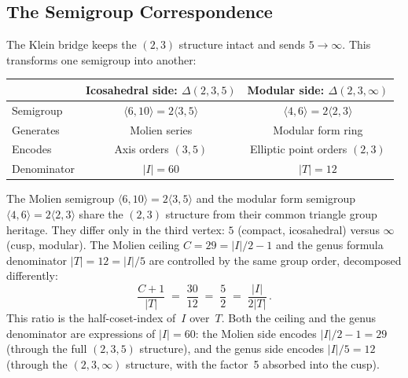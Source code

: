 \documentclass[11pt,letterpaper]{article}
\theoremstyle{definition}
\newcommand{\abs}[1]{\lvert #1 \rvert}
\newcommand{\gen}[1]{\langle #1 \rangle}
\begin{document}
\subsection{The Semigroup Correspondence}\label{sec:semigroups}
The Klein bridge keeps the $(2,3)$ structure intact and sends $5\to\infty$.  This transforms one semigroup into another:
\medskip
\begin{center}
\begin{tabular}{lcc}
\toprule
& Icosahedral side: $\Delta(2,3,5)$ & Modular side: $\Delta(2,3,\infty)$ \\
\midrule
Semigroup & $\gen{6,10}=2\gen{3,5}$ & $\gen{4,6}=2\gen{2,3}$ \\
Generates & Molien series & Modular form ring \\
Encodes & Axis orders $(3,5)$ & Elliptic point orders $(2,3)$ \\
Denominator & $\abs{I}=60$ & $\abs{T}=12$ \\
\bottomrule
\end{tabular}
\end{center}
\medskip
The Molien semigroup $\gen{6,10}=2\gen{3,5}$ and the modular form semigroup $\gen{4,6}=2\gen{2,3}$ share the $(2,3)$ structure from their common triangle group heritage.  They differ only in the third vertex: $5$ (compact, icosahedral) versus $\infty$ (cusp, modular).  The Molien ceiling $C=29=\abs{I}/2-1$ and the genus formula denominator $\abs{T}=12=\abs{I}/5$ are controlled by the same group order, decomposed differently:
\begin{equation}\label{eq:critical-ratio}
  \frac{C+1}{\abs{T}} \;=\; \frac{30}{12} \;=\; \frac{5}{2} \;=\; \frac{\abs{I}}{2\abs{T}}\,.
\end{equation}
This ratio is the half-coset-index of~$I$ over~$T$.  Both the ceiling and the genus denominator are expressions of $\abs{I}=60$: the Molien side encodes $\abs{I}/2-1=29$ (through the full $(2,3,5)$ structure), and the genus side encodes $\abs{I}/5=12$ (through the $(2,3,\infty)$ structure, with the factor~5 absorbed into the cusp).
\end{document}
